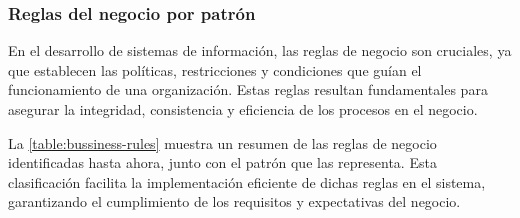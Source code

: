 \subsubsection{Reglas del negocio por patrón}

En el desarrollo de sistemas de información, las reglas de negocio son cruciales, ya que establecen las políticas, restricciones y condiciones que guían el funcionamiento de una organización. Estas reglas resultan fundamentales para asegurar la integridad, consistencia y eficiencia de los procesos en el negocio.

La \autoref{table:bussiness-rules} muestra un resumen de las reglas de negocio identificadas hasta ahora, junto con el patrón que las representa. Esta clasificación facilita la implementación eficiente de dichas reglas en el sistema, garantizando el cumplimiento de los requisitos y expectativas del negocio.


